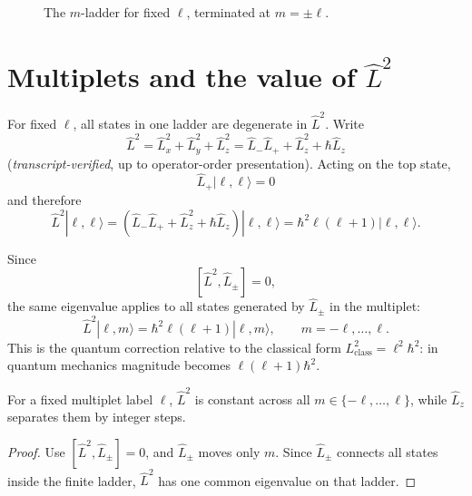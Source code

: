\begin{figure}
\centering
{}
\caption{The \(m\)-ladder for fixed \(\ell\), terminated at \(m=\pm\ell\).}
\end{figure}

\section{Multiplets and the value of \(\hat L^2\)}
For fixed \(\ell\), all states in one ladder are degenerate in \(\hat L^2\). Write
\[
\hat L^2=\hat L_x^2+\hat L_y^2+\hat L_z^2
=\hat L_-\hat L_+ + \hat L_z^2+\hbar \hat L_z
\]
(\textit{transcript-verified}, up to operator-order presentation). Acting on the top state,
\[
\hat L_+|\ell,\ell\rangle=0
\]
and therefore
\[
\hat L^2|\ell,\ell\rangle
=(\hat L_-\hat L_++\hat L_z^2+\hbar\hat L_z)|\ell,\ell\rangle
=\hbar^2\ell(\ell+1)|\ell,\ell\rangle.
\]

Since
\[
[\hat L^2,\hat L_\pm]=0,
\]
the same eigenvalue applies to all states generated by \(\hat L_\pm\) in the multiplet:
\[
\hat L^2|\ell,m\rangle=\hbar^2\ell(\ell+1)|\ell,m\rangle,\qquad m=-\ell,\ldots,\ell.
\]
This is the quantum correction relative to the classical form \(L_{\text{class}}^2=\ell^2\hbar^2\): in quantum mechanics magnitude becomes \(\ell(\ell+1)\hbar^2\).

\begin{proposition}
For a fixed multiplet label \(\ell\), \(\hat L^2\) is constant across all \(m\in\{-\ell,\ldots,\ell\}\), while \(\hat L_z\) separates them by integer steps.
\end{proposition}
\begin{proof}
Use \([\hat L^2,\hat L_\pm]=0\), and \(\hat L_\pm\) moves only \(m\). Since \(\hat L_\pm\) connects all states inside the finite ladder, \(\hat L^2\) has one common eigenvalue on that ladder.
\end{proof}

